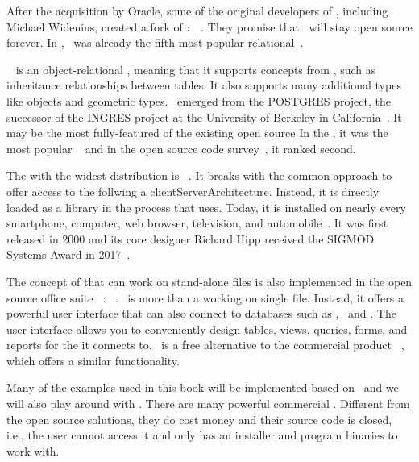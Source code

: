 After the acquisition by Oracle, some of the original developers of \mysql, including Michael Widenius, created a fork of \mysql:~\mariadb~\cite{R2014MM,B2019LTMEELFFSAA,D2015LMAM,AA2018QAWMV1ITSQ,AA2018QAWMV2IDQ}.
They promise that \mariadb\ will stay open source forever.
In \cite{PMPVEPWGSMB2025ATAODMSTTHOOSP}, \mariadb\ was already the fifth most popular relational~.

\postgresql~\cite{TA2024DDAMWPAM,FP2023LP,OH2017PUAR,B2024PELUYDW} is an object-relational , meaning that it supports concepts from , such as inheritance relationships between tables.
It also supports many additional types like  objects and geometric types.
\postgresql\ emerged from the POSTGRES project, the successor of the INGRES project at the University of Berkeley in California~\cite{C20245YOQ}.
It may be the most fully-featured of the existing open source  
In the , it was the most popular ~\cite{SE:SO:2024DS} and in the open source code survey~\cite{PMPVEPWGSMB2025ATAODMSTTHOOSP}, it ranked second.

The   with the widest distribution is \sqlite~\cite{WB2019RHSOOS,GPBHKP2022SPPAF,C20245YOQ,HWACIS:HO2023WKUOS}.
It breaks with the common approach to offer access to the  follwing a \gls{clientServerArchitecture}.
Instead, it is directly loaded as a library in the process that uses.
Today, it is installed on nearly every smartphone, computer, web browser, television, and automobile~\cite{WB2019RHSOOS,GPBHKP2022SPPAF,C20245YOQ}.
It was first released in 2000 and its core designer Richard Hipp received the SIGMOD Systems Award in 2017~\cite{C20245YOQ}.

The concept of  that can work on stand-alone files is also implemented in the open source office suite \libreoffice~\cite{DF2024LTDF,GL2012LTSOOSSCBAFACSOL,S2022L7PFEUU}: \libreofficeBase~\cite{FNFHWSKLSSGLFRSRPLJG2022BG7R1BOL7C,S2022L7PFEUU}.
\libreofficeBase\ is more than a  working on single file.
Instead, it offers a powerful user interface that can also connect to databases such as \mysql, \mariadb\ and \postgresql.
The user interface allows you to conveniently design tables, views, queries, forms, and reports for the  it connects to.
\libreofficeBase\ is a free alternative to the commercial product \microsoftAccess~\cite{SSI2023MA2BTA,B2020HOMA2,UC2021AFD}, which offers a similar functionality.

Many of the examples used in this book will be implemented based on \postgresql\ and we will also play around with \libreofficeBase.%
%
\endhsection%
%
%
%
There are many powerful commercial .
Different from the open source solutions, they do cost money and their source code is closed, i.e., the user cannot access it and only has an installer and program binaries to work with.


